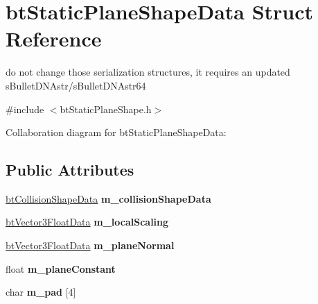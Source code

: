\hypertarget{structbt_static_plane_shape_data}{\section{bt\+Static\+Plane\+Shape\+Data Struct Reference}
\label{structbt_static_plane_shape_data}
}


do not change those serialization structures, it requires an updated s\+Bullet\+D\+N\+Astr/s\+Bullet\+D\+N\+Astr64  




{\ttfamily \#include $<$bt\+Static\+Plane\+Shape.\+h$>$}



Collaboration diagram for bt\+Static\+Plane\+Shape\+Data\+:
\subsection*{Public Attributes}
\begin{DoxyCompactItemize}
\item 
\hypertarget{structbt_static_plane_shape_data_acda49bbbfb84ecf1ef04488927dfbc6a}{\hyperlink{structbt_collision_shape_data}{bt\+Collision\+Shape\+Data} {\bfseries m\+\_\+collision\+Shape\+Data}}\label{structbt_static_plane_shape_data_acda49bbbfb84ecf1ef04488927dfbc6a}

\item 
\hypertarget{structbt_static_plane_shape_data_a25b5dddfd3f4d064726e98d50fe5f514}{\hyperlink{structbt_vector3_float_data}{bt\+Vector3\+Float\+Data} {\bfseries m\+\_\+local\+Scaling}}\label{structbt_static_plane_shape_data_a25b5dddfd3f4d064726e98d50fe5f514}

\item 
\hypertarget{structbt_static_plane_shape_data_af744597a06773b77870eb6f916b73a32}{\hyperlink{structbt_vector3_float_data}{bt\+Vector3\+Float\+Data} {\bfseries m\+\_\+plane\+Normal}}\label{structbt_static_plane_shape_data_af744597a06773b77870eb6f916b73a32}

\item 
\hypertarget{structbt_static_plane_shape_data_a182b2ddfaa9efb2235df867f3bb9a2e1}{float {\bfseries m\+\_\+plane\+Constant}}\label{structbt_static_plane_shape_data_a182b2ddfaa9efb2235df867f3bb9a2e1}

\item 
\hypertarget{structbt_static_plane_shape_data_ae97b942fcfb21fff59ba23a2d9b5346f}{char {\bfseries m\+\_\+pad} \mbox{[}4\mbox{]}}\label{structbt_static_plane_shape_data_ae97b942fcfb21fff59ba23a2d9b5346f}

\end{DoxyCompactItemize}


